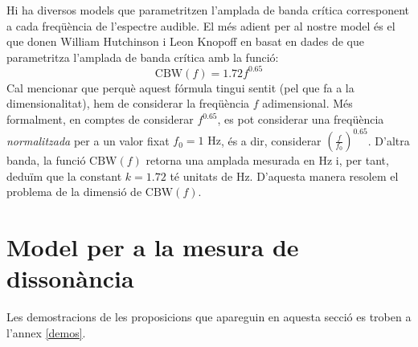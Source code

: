 \documentclass{article}
\theoremstyle{math}
\theoremstyle{TheoremNum}
\newcommand{\0}{\ensuremath{\vb{0}}}
\newcommand\Hz{\text{ Hz}}
\begin{document}
Hi ha diversos models que parametritzen l'amplada de banda crítica corresponent a cada freqüència de l'espectre audible. El més adient per al nostre model és el que donen William Hutchinson i Leon Knopoff en \cite{hutchinson} basat en dades de \cite{plomp,goodwin,mayer} que parametritza l'amplada de banda crítica amb la funció:
\begin{equation}
    \text{CBW}(f)=1.72 f^{0.65}
    \label{CBW}
\end{equation}
Cal mencionar que perquè aquest fórmula tingui sentit (pel que fa a la dimensionalitat), hem de considerar la freqüència $f$ adimensional. Més formalment, en comptes de considerar $f^{0.65}$, es pot considerar una freqüència \textit{normalitzada} per a un valor fixat $f_0=1\Hz$, és a dir, considerar ${\left(\frac{f}{f_0}\right)}^{0.65}$. D'altra banda, la funció $\text{CBW}(f)$ retorna una amplada mesurada en Hz i, per tant, deduïm que la constant $k=1.72$ té unitats de Hz. D'aquesta manera resolem el problema de la dimensió de $\text{CBW}(f)$.
\section{Model per a la mesura de dissonància}\label{model}
\noindent Les demostracions de les proposicions que apareguin en aquesta secció es troben a l'annex \ref{demos}.
\end{document}
